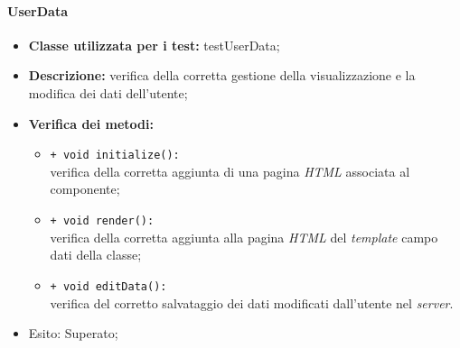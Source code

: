 \paragraph{UserData}
\begin{flushleft}
\begin{itemize}
\item \textbf{Classe utilizzata per i test:} testUserData;
\item \textbf{Descrizione:} verifica della corretta gestione della visualizzazione e la modifica dei dati dell'utente;
\item \textbf{Verifica dei metodi:}
\begin{sloppypar}
\begin{itemize}
\item \texttt{+ void initialize():}\\ verifica della corretta aggiunta di una pagina \textit{HTML} associata al componente;
\item \texttt{+ void render():}\\ verifica della corretta aggiunta alla pagina \textit{HTML} del \textit{template} campo dati della classe;
\item \texttt{+ void editData():}\\ verifica del corretto salvataggio dei dati modificati dall'utente nel \textit{server}.
\end{itemize}
\end{sloppypar}
\item Esito: Superato;
\end{itemize}
\end{flushleft}

